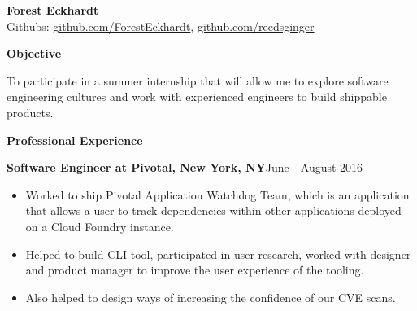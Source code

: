 \documentclass[10pt,a4papaer]{article}
\begin{document}
	{\selectfont
		
		\begin{center}	
			{\huge\textbf{Forest Eckhardt}} \\
			Githubs:
			\href{http://www.github.com/ForestEckhardt}{github.com/ForestEckhardt}, \href{http://www.github.com/reedsginger}{github.com/reedsginger}  \\
		\end{center}
		
		{\noindent\textbf{Objective}}\vspace*{-20px}\\
		
		\noindent\makebox[\linewidth]{\rule{\textwidth}{1.2pt}}
		
		\setlength{\leftskip}{15pt}
		
		{\noindent To participate in a summer internship that will allow me to explore software engineering cultures and work with experienced engineers to build shippable products.}\\
		
		\setlength{\leftskip}{0pt}
		
		{\noindent\textbf{Professional Experience}}\vspace*{-20px}\\
		
		\noindent\makebox[\linewidth]{\rule{\textwidth}{1.2pt}}
		
		\setlength{\leftskip}{15pt}
		
		{\noindent\textbf{Software Engineer at Pivotal, New York, NY}}{\hfill June - August 2016}
		
		\begin{itemize}[noitemsep, topsep=0pt]
			\item Worked to ship Pivotal Application Watchdog Team, which is an application that allows a user to track dependencies within other applications deployed on a Cloud Foundry instance. 
			\item Helped to build CLI tool, participated in user research, worked with designer and product manager to improve the user experience of the tooling. \item Also helped to design ways of increasing the confidence of our CVE scans.\\
		\end{itemize}
		
}
\end{document}

